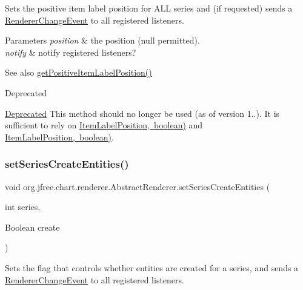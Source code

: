 Sets the positive item label position for A\+LL series and (if requested) sends a \mbox{\hyperlink{}{Renderer\+Change\+Event}} to all registered listeners.


\begin{DoxyParams}{Parameters}
{\em position} & the position ({\ttfamily null} permitted). \\
\hline
{\em notify} & notify registered listeners?\\
\hline
\end{DoxyParams}
\begin{DoxySeeAlso}{See also}
\mbox{\hyperlink{classorg_1_1jfree_1_1chart_1_1renderer_1_1_abstract_renderer_a2a9b96ccec98379882ae3c8a24e09261}{get\+Positive\+Item\+Label\+Position()}}
\end{DoxySeeAlso}
\begin{DoxyRefDesc}{Deprecated}
\item[\mbox{\hyperlink{deprecated__deprecated000139}{Deprecated}}]This method should no longer be used (as of version 1..). It is sufficient to rely on \mbox{\hyperlink{}{Item\+Label\+Position, boolean)}} and \mbox{\hyperlink{}{Item\+Label\+Position, boolean)}}. \end{DoxyRefDesc}
\mbox{\label{classorg_1_1jfree_1_1chart_1_1renderer_1_1_abstract_renderer_a2e6b07a8f5a71906f27d40c5bfa0ed54}} 
\subsubsection{\texorpdfstring{set\+Series\+Create\+Entities()}{setSeriesCreateEntities()}\hspace{0.1cm}{\footnotesize\ttfamily [1/2]}}
{\footnotesize\ttfamily void org.\+jfree.\+chart.\+renderer.\+Abstract\+Renderer.\+set\+Series\+Create\+Entities (\begin{DoxyParamCaption}\item[{int}]{series,  }\item[{Boolean}]{create }\end{DoxyParamCaption})}

Sets the flag that controls whether entities are created for a series, and sends a \mbox{\hyperlink{}{Renderer\+Change\+Event}} to all registered listeners.


